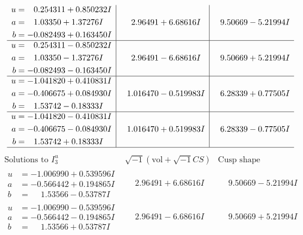 \documentclass[1p]{elsarticle_modified}
\theoremstyle{definition}
\newcommand{\I}{\sqrt{-1}}
\begin{document}
$$\begin{array}{c|c|c}
\begin{aligned}
u &= \phantom{-}0.254311 + 0.850232 I \\
a &= \phantom{-}1.03350 + 1.37276 I \\
b &= -0.082493 + 0.163450 I\end{aligned}
 & \phantom{-}2.96491 + 6.68616 I & \phantom{-}9.50669 - 5.21994 I \\ \hline\begin{aligned}
u &= \phantom{-}0.254311 - 0.850232 I \\
a &= \phantom{-}1.03350 - 1.37276 I \\
b &= -0.082493 - 0.163450 I\end{aligned}
 & \phantom{-}2.96491 - 6.68616 I & \phantom{-}9.50669 + 5.21994 I \\ \hline\begin{aligned}
u &= -1.041820 + 0.410831 I \\
a &= -0.406675 + 0.084930 I \\
b &= \phantom{-}1.53742 - 0.18333 I\end{aligned}
 & \phantom{-}1.016470 - 0.519983 I & \phantom{-}6.28339 + 0.77505 I \\ \hline\begin{aligned}
u &= -1.041820 - 0.410831 I \\
a &= -0.406675 - 0.084930 I \\
b &= \phantom{-}1.53742 + 0.18333 I\end{aligned}
 & \phantom{-}1.016470 + 0.519983 I & \phantom{-}6.28339 - 0.77505 I\\
 \hline 
 \end{array}$$\newpage$$\begin{array}{c|c|c}  
\text{Solutions to }I^u_{3}& \I (\text{vol} + \sqrt{-1}CS) & \text{Cusp shape}\\
 \hline 
\begin{aligned}
u &= -1.006990 + 0.539596 I \\
a &= -0.566442 + 0.194865 I \\
b &= \phantom{-}1.53566 - 0.53787 I\end{aligned}
 & \phantom{-}2.96491 + 6.68616 I & \phantom{-}9.50669 - 5.21994 I \\ \hline\begin{aligned}
u &= -1.006990 - 0.539596 I \\
a &= -0.566442 - 0.194865 I \\
b &= \phantom{-}1.53566 + 0.53787 I\end{aligned}
 & \phantom{-}2.96491 - 6.68616 I & \phantom{-}9.50669 + 5.21994 I \\ \hline\begin{aligned}

\end{aligned}
\end{array}$$
\end{document}
